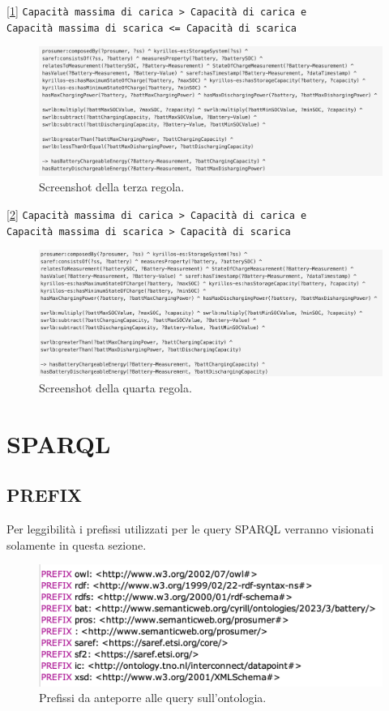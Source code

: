 [\ref*{fig:charginggreater}] \texttt{Capacità massima di carica > Capacità di carica e\\ Capacità massima di scarica <= Capacità di scarica}

\begin{figure}[H]
    \centering
    \includegraphics[width=15cm]{images/charging >.png}
    \caption{Screenshot della terza regola.}
    \label{fig:charginggreater}
\end{figure}

[\ref*{fig:bothgreater}] \texttt{Capacità massima di carica > Capacità di carica e\\ Capacità massima di scarica > Capacità di scarica}

\begin{figure}[H]
    \centering
    \includegraphics[width=15cm]{images/both >.png}
    \caption{Screenshot della quarta regola.}
    \label{fig:bothgreater}
\end{figure}

\section{SPARQL}

\subsection{PREFIX}
Per leggibilità i prefissi utilizzati per le query SPARQL verranno visionati solamente in questa sezione.

\begin{figure}[H]
    \centering
    \includegraphics[width=15cm]{images/prefissi.png}
    \caption{Prefissi da anteporre alle query sull'ontologia.}
    \label{fig:prefix}
\end{figure}

